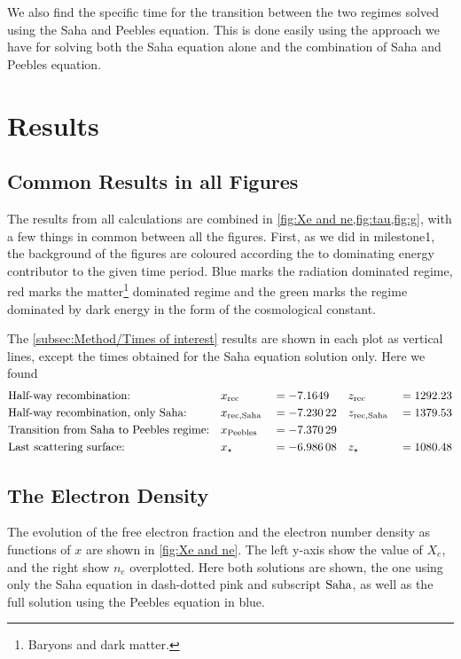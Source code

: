 \documentclass[10pt,a4paper]{article}
\begin{document}
We also find the specific time for the transition between the two regimes solved using the Saha and Peebles equation. This is done easily using the approach we have for solving both the Saha equation alone and the combination of Saha and Peebles equation.

\section{Results}
\label{sec:Results}
\subsection{Common Results in all Figures}
\label{subsec:Results/Common in figs}
The results from all calculations are combined in \cref{fig:Xe and ne,fig:tau,fig:g}, with a few things in common between all the figures. First, as we did in milestone1\citep{milestone1}, the background of the figures are coloured according the to dominating energy contributor to the given time period. Blue marks the radiation dominated regime, red marks the matter\footnote{Baryons and dark matter.} dominated regime and the green marks the regime dominated by dark energy in the form of the cosmological constant.

The \cref{subsec:Method/Times of interest} results are shown in each plot as vertical lines, except the times obtained for the Saha equation solution only. Here we found
\begin{align*}
    & \text{Half-way recombination:} && x_{\rm{rec}} &&= \num{-7.1649} && z_{\rm{rec}} &&= \num{1292.23} 
    \\
    & \text{Half-way recombination, only Saha:} && x_{\rm{rec,Saha}} &&= \num{-7.23022} && z_{\rm{rec,Saha}} &&= \num{1379.53}
    \\
    & \text{Transition from Saha to Peebles regime:} && x_{\rm{Peebles}} &&= \num{-7.37029} && &
    \\
    & \text{Last scattering surface:} && x_{\star} &&= \num{-6.98608} && z_{\star} &&= \num{1080.48}
\end{align*}

\subsection{The Electron Density}
\label{subsec:Results/Electron density}
The evolution of the free electron fraction and the electron number density as functions of $x$ are shown in \cref{fig:Xe and ne}. The left y-axis show the value of $X_e$, and the right show $n_e$ overplotted. Here both solutions are shown, the one using only the Saha equation in dash-dotted pink and subscript $\rm{Saha}$, as well as the full solution using the Peebles equation in blue. 
\end{document}
